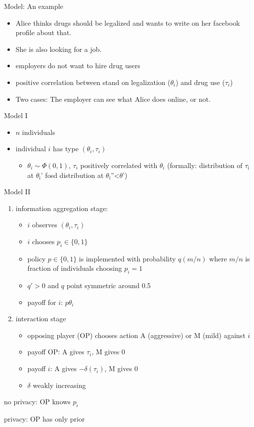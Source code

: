 \documentclass[bigger]{beamer}
\begin{document}
\begin{frame}[label={sec:orgheadline7}]{Model: An example}
\begin{itemize}
\item Alice thinks drugs should be legalized and wants to write on her facebook profile about that.
\item She is also looking for a job.
\item employers do not want to hire drug users
\item positive correlation between stand on legalization (\(\theta_i\)) and drug use (\(\tau_i\))
\item Two cases: The employer can see what Alice does online, or not.
\end{itemize}
\end{frame}



\begin{frame}[label={sec:orgheadline8}]{Model I}
\begin{itemize}
\item \(n\) individuals
\item individual \(i\) has type \((\theta_i,\tau_i)\)
\begin{itemize}
\item \(\theta_i\sim\Phi(0,1)\), \(\tau_i\) positively correlated with \(\theta_i\) (formally: distribution of \(\tau_{\text{i}}\) at \(\theta_{\text{i}}\)' fosd distribution at \(\theta_{\text{i}}\)''<\(\theta\)')
\end{itemize}
\end{itemize}
\end{frame}

\begin{frame}[label={sec:orgheadline9}]{Model II}
\begin{enumerate}
\item information aggregation stage:
\begin{itemize}
\item \(i\) observes \((\theta_i,\tau_i)\)
\item \(i\) chooses \(p_i\in\{0,1\}\)
\item policy \(p\in\{0,1\}\) is implemented with probability \(q(m/n)\) where \(m/n\) is fraction of individuals choosing \(p_i=1\)
\item \(q'>0\) and \(q\) point symmetric around 0.5
\item payoff for \(i\): \(p\theta_i\)
\end{itemize}
\item interaction stage
\begin{itemize}
\item opposing player (OP) chooses action A (aggressive) or M (mild) against \(i\)
\item payoff OP: A gives \(\tau_i\), M gives 0
\item payoff \(i\): A gives \(-\delta(\tau_i)\), M gives 0
\item \(\delta\) weakly increasing
\end{itemize}
\end{enumerate}

no privacy: OP knows \(p_i\)

privacy: OP has only prior
\end{frame}
\end{document}

